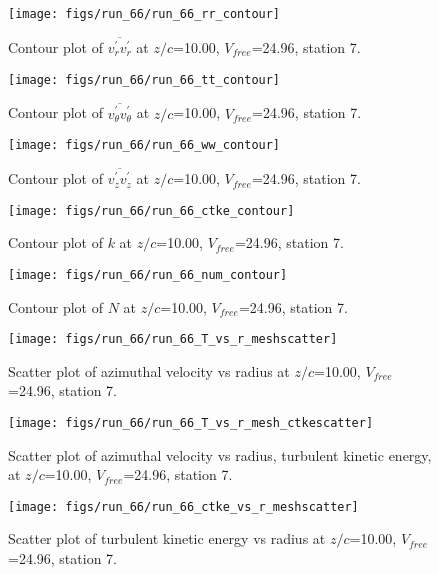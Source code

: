 \begin{figure}[H]
\centering
\texttt{[image: figs/run\_66/run\_66\_rr\_contour]}
\caption{Contour plot of $\overline{v_{r}^{\prime} v_{r}^{\prime}}$ at $z/c$=10.00, $V_{free}$=24.96, station 7.}
\end{figure}


\begin{figure}[H]
\centering
\texttt{[image: figs/run\_66/run\_66\_tt\_contour]}
\caption{Contour plot of $\overline{v_{\theta}^{\prime} v_{\theta}^{\prime}}$ at $z/c$=10.00, $V_{free}$=24.96, station 7.}
\end{figure}


\begin{figure}[H]
\centering
\texttt{[image: figs/run\_66/run\_66\_ww\_contour]}
\caption{Contour plot of $\overline{v_{z}^{\prime} v_{z}^{\prime}}$ at $z/c$=10.00, $V_{free}$=24.96, station 7.}
\end{figure}


\begin{figure}[H]
\centering
\texttt{[image: figs/run\_66/run\_66\_ctke\_contour]}
\caption{Contour plot of $k$ at $z/c$=10.00, $V_{free}$=24.96, station 7.}
\end{figure}


\begin{figure}[H]
\centering
\texttt{[image: figs/run\_66/run\_66\_num\_contour]}
\caption{Contour plot of $N$ at $z/c$=10.00, $V_{free}$=24.96, station 7.}
\end{figure}


\begin{figure}[H]
\centering
\texttt{[image: figs/run\_66/run\_66\_T\_vs\_r\_meshscatter]}
\caption{Scatter plot of azimuthal velocity vs radius at $z/c$=10.00, $V_{free}$=24.96, station 7.}
\end{figure}


\begin{figure}[H]
\centering
\texttt{[image: figs/run\_66/run\_66\_T\_vs\_r\_mesh\_ctkescatter]}
\caption{Scatter plot of azimuthal velocity vs radius, turbulent kinetic energy, at $z/c$=10.00, $V_{free}$=24.96, station 7.}
\end{figure}


\begin{figure}[H]
\centering
\texttt{[image: figs/run\_66/run\_66\_ctke\_vs\_r\_meshscatter]}
\caption{Scatter plot of turbulent kinetic energy vs radius at $z/c$=10.00, $V_{free}$=24.96, station 7.}
\end{figure}


